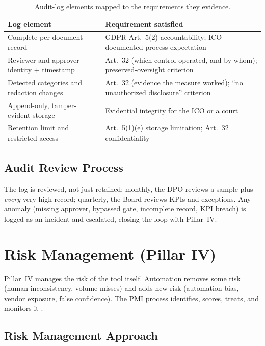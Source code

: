 \documentclass[12pt,a4paper]{article}
\begin{document}
\begin{table}[H]
\centering
\small
{}
\begin{tabular}{@{} p{6.0cm} p{8.0cm} @{}}
\toprule
\textbf{\color{accentdark}Log element} & \textbf{\color{accentdark}Requirement satisfied} \\
\midrule
Complete per-document record & GDPR Art.~5(2) accountability; ICO documented-process expectation \\
Reviewer and approver identity + timestamp & Art.~32 (which control operated, and by whom); preserved-oversight criterion \\
Detected categories and redaction changes & Art.~32 (evidence the measure worked); ``no unauthorized disclosure'' criterion \\
Append-only, tamper-evident storage & Evidential integrity for the ICO or a court \\
Retention limit and restricted access & Art.~5(1)(e) storage limitation; Art.~32 confidentiality \\
\bottomrule
\end{tabular}
\caption{Audit-log elements mapped to the requirements they evidence.}
\label{tab:compliance}
\end{table}

\subsection{Audit Review Process}

The log is reviewed, not just retained: monthly, the DPO reviews a sample plus \emph{every} very-high record; quarterly, the Board reviews KPIs and exceptions. Any anomaly (missing approver, bypassed gate, incomplete record, KPI breach) is logged as an incident and escalated, closing the loop with Pillar~IV.

\section{Risk Management (Pillar IV)}
\label{sec:risk}

Pillar~IV manages the risk of the tool itself. Automation removes some risk (human inconsistency, volume misses) and adds new risk (automation bias, vendor exposure, false confidence). The PMI process identifies, scores, treats, and monitors it \cite{falchi_slides}.

\subsection{Risk Management Approach}
\end{document}
